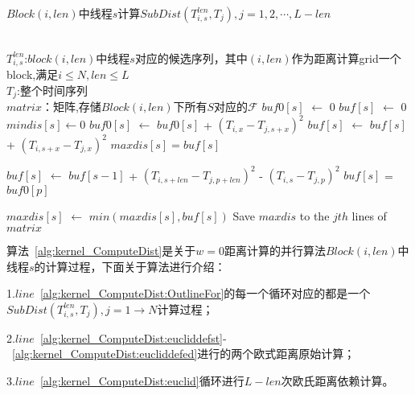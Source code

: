 \begin{breakablealgorithm}
	\caption{$Block(i,len)$中线程$s$计算$SubDist(T_{i,s}^{len},T_j),j=1,2,\cdots,L-len$}
	\label{alg:kernel_ComputeDist}
	\begin{algorithmic}[1]
		\Require ~~\\
		$T_{i,s}^{len}$:$block(i,len)$中线程$s$对应的候选序列，其中$(i,len)$作为距离计算grid一个block,满足$i \leq N,len \leq L$ \\
		$T_j$:整个时间序列
		\Ensure ~~\\
		$matrix$：矩阵,存储$Block(i,len)$下所有$S$对应的$\mathcal{F}$
			  \label{alg:kernel_ComputeDist:OutlineFor}
				\State $buf0[s]$ $\gets$ $0$ \label{alg:kernel_ComputeDist:eucliddefst}
				\State $buf[s]$ $\gets$ $0$
				\State $mindis[s] \gets 0$
					\State $buf0[s]$ $\gets$ $buf0[s]$ + $(T_{i,x}-T_{j,s+x})^2$  \label{alg:kernel_ComputeDist:dengjia1}
					\State $buf[s]$ $\gets$ $buf[s]$ + $(T_{i,s+x}-T_{j,x})^2$
				\EndFor  \label{alg:kernel_ComputeDist:eucliddefed}
				\State $maxdis[s] = buf[s]$	
				
				 \label{alg:kernel_ComputeDist:euclid}
					   \label{alg:kernel_ComputeDist:Warpdevergence1}
						\State $buf[s]$ $\gets$ $buf[s-1]$ + $(T_{i,s+len}-T_{j,p+len})^2$ - $(T_{i,s}-T_{j,p})^2$
					\EndIf
					     \label{alg:kernel_ComputeDist:Warpdevergence2}
						\State $buf[s]$ = $buf0[p]$ \label{alg:kernel_ComputeDist:dengjia2}
					\EndIf
					
					\State $maxdis[s]$ $\gets$ $min(maxdis[s],buf[s])$
				\EndFor
				\State Save $maxdis$ to the $jth$ lines of $matrix$ \label{maxdisoutput}
			\EndFor
	\end{algorithmic}
\end{breakablealgorithm}

算法~\ref{alg:kernel_ComputeDist}是关于$w=0$距离计算的并行算法$Block(i,len)$中线程$s$的计算过程，下面关于算法进行介绍：

1.$line$~\ref{alg:kernel_ComputeDist:OutlineFor}的每一个循环对应的都是一个$SubDist(T_{i,s}^{len},T_j),j=1\to N$计算过程；

2.$line$~\ref{alg:kernel_ComputeDist:eucliddefst}-~\ref{alg:kernel_ComputeDist:eucliddefed}进行的两个欧式距离原始计算；

3.$line$~\ref{alg:kernel_ComputeDist:euclid}循环进行$L-len$次欧氏距离依赖计算。

